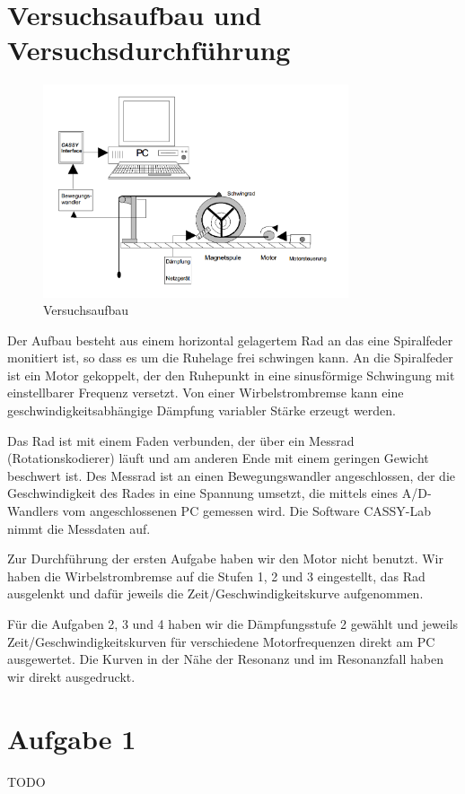 \documentclass[a4paper,german,12pt,smallheadings]{scrartcl}
\begin{document}
\section{Versuchsaufbau und Versuchsdurchführung}
\begin{figure}
  \includegraphics[width=9cm]{aufbau.png}
  \caption{Versuchsaufbau}
\end{figure}
Der Aufbau besteht aus einem horizontal gelagertem Rad an das eine Spiralfeder
monitiert ist, so dass es um die Ruhelage frei schwingen kann. An die
Spiralfeder ist ein Motor gekoppelt, der den Ruhepunkt in eine sinusförmige
Schwingung mit einstellbarer Frequenz versetzt. Von einer Wirbelstrombremse
kann eine geschwindigkeitsabhängige Dämpfung variabler Stärke erzeugt werden.

Das Rad ist mit einem Faden verbunden, der über ein Messrad (Rotationskodierer)
läuft und am anderen Ende mit einem geringen Gewicht beschwert ist. Des Messrad
ist an einen Bewegungswandler angeschlossen, der die Geschwindigkeit des Rades
in eine Spannung umsetzt, die mittels eines A/D-Wandlers vom angeschlossenen PC
gemessen wird. Die Software CASSY-Lab nimmt die Messdaten auf.

Zur Durchführung der ersten Aufgabe haben wir den Motor nicht benutzt. Wir
haben die Wirbelstrombremse auf die Stufen 1, 2 und 3 eingestellt, das Rad
ausgelenkt und dafür jeweils die Zeit/Geschwindigkeitskurve aufgenommen.

Für die Aufgaben 2, 3 und 4 haben wir die Dämpfungsstufe 2 gewählt und jeweils
Zeit/Geschwindigkeitskurven für verschiedene Motorfrequenzen direkt am PC
ausgewertet. Die Kurven in der Nähe der Resonanz und im Resonanzfall haben wir
direkt ausgedruckt.

\section{Aufgabe 1}
TODO
\end{document}
